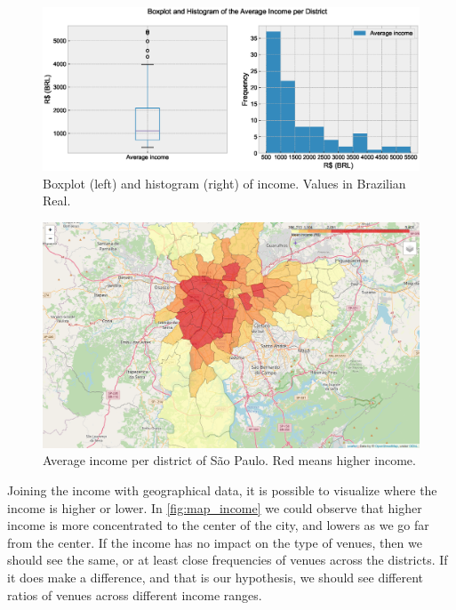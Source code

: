 \documentclass[12pt]{article}
\begin{document}
\begin{figure}[htb]
        \centering
        \includegraphics[width=\linewidth]{plot_income.eps}
        \caption{Boxplot (left) and histogram (right) of income. Values in
        Brazilian Real.\label{fig:plot_income}}
\end{figure}

\begin{figure}
        \centering
        \includegraphics[width=\linewidth]{map_income.png}
        \caption{Average income per district of São Paulo. Red means higher
        income.\label{fig:map_income}}
\end{figure}

Joining the income with geographical data, it is possible to visualize where
the income is higher or lower. In \autoref{fig:map_income} we could observe that
higher income is more concentrated to the center of the city, and lowers as we
go far from the center. If the income has no impact on the type of venues, then
we should see the same, or at least close frequencies of venues across the
districts. If it does make a difference, and that is our hypothesis, we should
see different ratios of venues across different income ranges.
\end{document}
